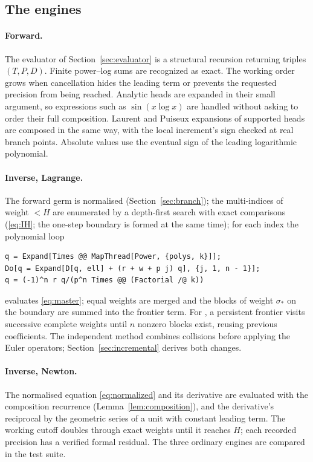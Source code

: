 \subsection{The engines}

\paragraph{Forward.} The evaluator of Section~\ref{sec:evaluator} is a structural recursion returning triples $(T,P,D)$. Finite power--log sums are recognized as exact. The working order grows when cancellation hides the leading term or prevents the requested precision from being reached. Analytic heads are expanded in their small argument, so expressions such as $\sin(x\log x)$ are handled without asking  to order their full composition. Laurent and Puiseux expansions of supported heads are composed in the same way, with the local increment's sign checked at real branch points. Absolute values use the eventual sign of the leading logarithmic polynomial.

\paragraph{Inverse, Lagrange.} The forward germ is normalised (Section~\ref{sec:branch}); the multi-indices of weight $<H$ are enumerated by a depth-first search with exact comparisons (\eqref{eq:IH}; the one-step boundary is formed at the same time); for each index the polynomial loop
\begin{lstlisting}
q = Expand[Times @@ MapThread[Power, {polys, k}]];
Do[q = Expand[D[q, ell] + (r + w + p j) q], {j, 1, n - 1}];
q = (-1)^n r q/(p^n Times @@ (Factorial /@ k))
\end{lstlisting}
evaluates \eqref{eq:master}; equal weights are merged and the blocks of weight $\sigma_*$ on the boundary are summed into the frontier term. For , a persistent frontier visits successive complete weights until $n$ nonzero blocks exist, reusing previous coefficients. The independent  method combines collisions before applying the Euler operators; Section~\ref{sec:incremental} derives both changes.

\paragraph{Inverse, Newton.} The normalised equation \eqref{eq:normalized} and its derivative are evaluated with the composition recurrence (Lemma~\ref{lem:composition}), and the derivative's reciprocal by the geometric series of a unit with constant leading term. The working cutoff doubles through exact weights until it reaches $H$; each recorded precision has a verified formal residual. The three ordinary engines are compared in the test suite.

